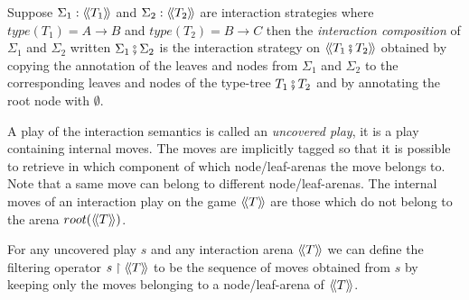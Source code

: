\begin{dfn}
Suppose $\Sigma_1 : {\langle\!\langle T_1 \rangle\!\rangle}$ and $\Sigma_2 :
{\langle\!\langle T_2 \rangle\!\rangle}$ are interaction strategies where $type(T_1) = A \rightarrow B$
and $type(T_2) = B \rightarrow C$ then
the \emph{interaction composition} of $\Sigma_1$ and $\Sigma_2$ written $\Sigma_1 \fatsemi \Sigma_2$
is the interaction strategy on ${\langle\!\langle T_1 \fatsemi T_2 \rangle\!\rangle}$ obtained by copying the annotation of the leaves and nodes from $\Sigma_1$ and $\Sigma_2$
to the corresponding leaves and nodes of the type-tree $T_1 \fatsemi T_2$ and by annotating the root node with $\emptyset$.
\end{dfn}

A play of the interaction semantics is called an \emph{uncovered
play}, it is a play containing internal moves.
The moves are implicitly tagged so that it is possible to retrieve in which component
of which node/leaf-arenas the move belongs to. Note that a same move can belong to different node/leaf-arenas.
The internal moves of an interaction play on the game ${\langle\!\langle T \rangle\!\rangle}$ are those which do not
belong to the arena $root({\langle\!\langle T \rangle\!\rangle})$.

For any uncovered play $s$ and any interaction arena ${\langle\!\langle T \rangle\!\rangle}$
we can define the filtering operator $s\upharpoonright {\langle\!\langle T \rangle\!\rangle}$ to be the
sequence of moves obtained from $s$ by keeping only the moves
belonging to a node/leaf-arena of ${\langle\!\langle T \rangle\!\rangle}$.


